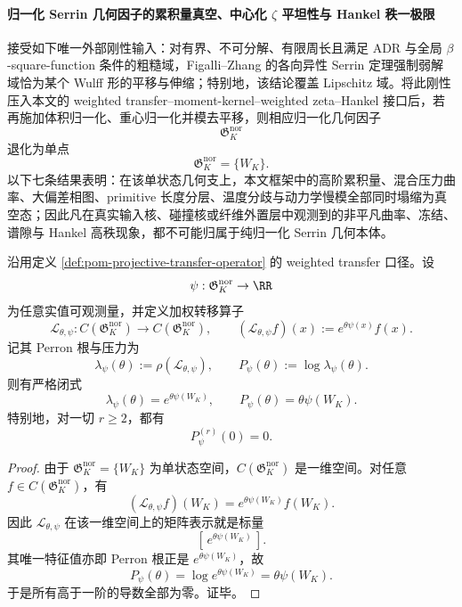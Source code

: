 \paragraph{归一化 Serrin 几何因子的累积量真空、中心化 \texorpdfstring{$\zeta$}{zeta} 平坦性与 Hankel 秩一极限}
接受如下唯一外部刚性输入：对有界、不可分解、有限周长且满足 ADR 与全局 \(\beta\)-square-function 条件的粗糙域，Figalli--Zhang 的各向异性 Serrin 定理强制弱解域恰为某个 Wulff 形的平移与伸缩；特别地，该结论覆盖 Lipschitz 域。将此刚性压入本文的 weighted transfer--moment-kernel--weighted zeta--Hankel 接口后，若再施加体积归一化、重心归一化并模去平移，则相应归一化几何因子
\[
\mathfrak G_{K}^{\mathrm{nor}}
\]
退化为单点
\[
\mathfrak G_{K}^{\mathrm{nor}}=\{W_K\}.
\]
以下七条结果表明：在该单状态几何支上，本文框架中的高阶累积量、混合压力曲率、大偏差相图、primitive 长度分层、温度分歧与动力学慢模全部同时塌缩为真空态；因此凡在真实输入核、碰撞核或纤维外置层中观测到的非平凡曲率、冻结、谱隙与 Hankel 高秩现象，都不可能归属于纯归一化 Serrin 几何本体。

\begin{theorem}\label{thm:xi-time-part9xc-serrin-geometry-all-cumulants-vanish}
沿用定义 \ref{def:pom-projective-transfer-operator} 的 weighted transfer 口径。设
\[
\psi:\mathfrak G_{K}^{\mathrm{nor}}\to \RR
\]
为任意实值可观测量，并定义加权转移算子
\[
\mathcal L_{\theta,\psi}:C(\mathfrak G_{K}^{\mathrm{nor}})\to C(\mathfrak G_{K}^{\mathrm{nor}}),
\qquad
(\mathcal L_{\theta,\psi}f)(x):=e^{\theta\psi(x)}f(x).
\]
记其 Perron 根与压力为
\[
\lambda_\psi(\theta):=\rho(\mathcal L_{\theta,\psi}),
\qquad
P_\psi(\theta):=\log\lambda_\psi(\theta).
\]
则有严格闭式
\[
\lambda_\psi(\theta)=e^{\theta\psi(W_K)},
\qquad
P_\psi(\theta)=\theta\psi(W_K).
\]
特别地，对一切 \(r\ge 2\)，都有
\[
P_\psi^{(r)}(0)=0.
\]
\end{theorem}
\begin{proof}
由于 \(\mathfrak G_{K}^{\mathrm{nor}}=\{W_K\}\) 为单状态空间，\(C(\mathfrak G_{K}^{\mathrm{nor}})\) 是一维空间。对任意 \(f\in C(\mathfrak G_{K}^{\mathrm{nor}})\)，有
\[
(\mathcal L_{\theta,\psi}f)(W_K)=e^{\theta\psi(W_K)}f(W_K).
\]
因此 \(\mathcal L_{\theta,\psi}\) 在该一维空间上的矩阵表示就是标量
\[
[\,e^{\theta\psi(W_K)}\,].
\]
其唯一特征值亦即 Perron 根正是 \(e^{\theta\psi(W_K)}\)，故
\[
P_\psi(\theta)=\log e^{\theta\psi(W_K)}=\theta\psi(W_K).
\]
于是所有高于一阶的导数全部为零。证毕。
\end{proof}

